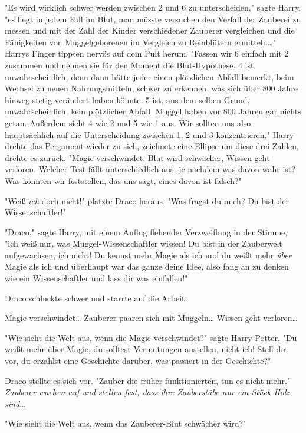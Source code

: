 {"Es wird wirklich schwer werden zwischen 2 und 6 zu unterscheiden," sagte Harry, "es liegt in jedem Fall im Blut, man müsste versuchen den Verfall der Zauberei zu messen und mit der Zahl der Kinder verschiedener Zauberer vergleichen und die Fähigkeiten von Muggelgeborenen im Vergleich zu Reinblütern ermitteln…" Harrys Finger tippten nervös auf dem Pult herum. "Fassen wir 6 einfach mit 2 zusammen und nennen sie für den Moment die Blut-Hypothese. 4 ist unwahrscheinlich, denn dann hätte jeder einen plötzlichen Abfall bemerkt, beim Wechsel zu neuen Nahrungsmitteln, schwer zu erkennen, was sich über 800 Jahre hinweg stetig verändert haben könnte. 5 ist, aus dem selben Grund, unwahrscheinlich, kein plötzlicher Abfall, Muggel haben vor 800 Jahren gar nichts getan. Außerdem sieht 4 wie 2 und 5 wie 1 aus. Wir sollten uns also hauptsächlich auf die Unterscheidung zwischen 1, 2 und 3 konzentrieren." Harry drehte das Pergament wieder zu sich, zeichnete eine Ellipse um diese drei Zahlen, drehte es zurück. "Magie verschwindet, Blut wird schwächer, Wissen geht verloren. Welcher Test fällt unterschiedlich aus, je nachdem was davon wahr ist? Was könnten wir feststellen, das uns sagt, eines davon ist falsch?"

"Weiß \emph{ich} doch nicht!" platzte Draco heraus. "Was fragst du mich? Du bist der Wissenschaftler!"

"Draco," sagte Harry, mit einem Anflug flehender Verzweiflung in der Stimme, "ich weiß nur, was Muggel-Wissenschaftler wissen! Du bist in der Zauberwelt aufgewachsen, ich nicht! Du kennst mehr Magie als ich und du weißt mehr \emph{über} Magie als ich und überhaupt war das ganze deine Idee, also fang an zu denken wie ein Wissenschaftler und lass dir was einfallen!"

Draco schluckte schwer und starrte auf die Arbeit.

Magie verschwindet… Zauberer paaren sich mit Muggeln… Wissen geht verloren…

"Wie sieht die Welt aus, wenn die Magie verschwindet?" sagte Harry Potter. "Du weißt mehr über Magie, du solltest Vermutungen anstellen, nicht ich! Stell dir vor, du erzählst eine Geschichte darüber, was passiert in der Geschichte?"

Draco stellte es sich vor. "Zauber die früher funktionierten, tun es nicht mehr." \emph{Zauberer wachen auf und stellen fest, dass ihre Zauberstäbe nur ein Stück Holz sind…}

"Wie sieht die Welt aus, wenn das Zauberer-Blut schwächer wird?"

}
